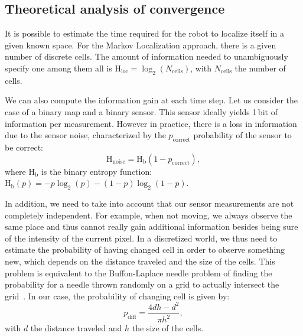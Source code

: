 \documentclass[letterpaper, 10pt, conference]{ieeeconf}
\newcommand{\ent}[1]{\mathrm{H}_\mathrm{#1}} %
\begin{document}
\subsection{Theoretical analysis of convergence}
\label{sec:theoreticalconv}

It is possible to estimate the time required for the robot to localize itself in a given known space.
For the Markov Localization approach, there is a given number of discrete cells.
The amount of information needed to unambiguously specify one among them all is $\ent{loc} = \log_2(N_\mathrm{cells})$, with $N_\mathrm{cells}$ the number of cells.

We can also compute the information gain at each time step.
Let us consider the case of a binary map and a binary sensor.
This sensor ideally yields 1\,bit of information per measurement.
However in practice, there is a loss in information due to the sensor noise, characterized by the $p_\mathrm{correct}$ probability of the sensor to be correct:
\begin{displaymath}
	\ent{noise} = \ent{b}(1 - p_\mathrm{correct}),
\end{displaymath}
where $\ent{b}$ is the binary entropy function: $\ent{b}(p) = -p\log_2(p) - (1-p)\log_2(1-p)$.

In addition, we need to take into account that our sensor measurements are not completely independent.
For example, when not moving, we always observe the same place and thus cannot really gain additional information besides being sure of the intensity of the current pixel.
In a discretized world, we thus need to estimate the probability of having changed cell in order to observe something new, which depends on the distance traveled and the size of the cells.
This problem is equivalent to the Buffon-Laplace needle problem of finding the probability for a needle thrown randomly on a grid to actually intersect the grid~\cite{laplace1820prob}.
In our case, the probability of changing cell is given by:
\begin{displaymath}
	p_\mathrm{diff} = \frac{4d h - d^2}{\pi h^2},
\end{displaymath}
with $d$ the distance traveled and $h$ the size of the cells.
\end{document}
